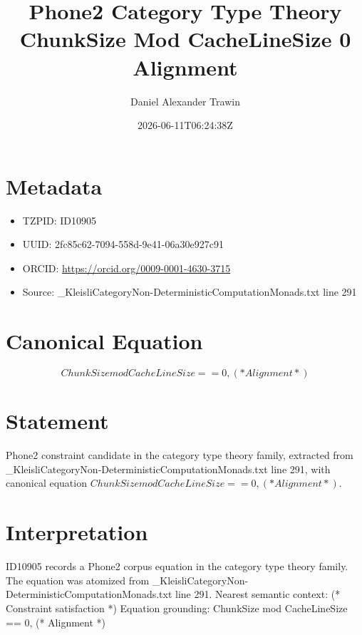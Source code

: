 \documentclass[11pt]{article}
\title{Phone2 Category Type Theory ChunkSize Mod CacheLineSize 0 Alignment}
\author{Daniel Alexander Trawin}
\date{2026-06-11T06:24:38Z}
\begin{document}
\maketitle
\section*{Metadata}
\begin{itemize}
\item TZPID: ID10905
\item UUID: 2fc85c62-7094-558d-9e41-06a30e927c91
\item ORCID: \url{https://orcid.org/0009-0001-4630-3715}
\item Source: _KleisliCategoryNon-DeterministicComputationMonads.txt line 291
\end{itemize}
\section*{Canonical Equation}
\[
ChunkSize mod CacheLineSize == 0, (* Alignment *)
\]
\section*{Statement}
Phone2 constraint candidate in the category type theory family, extracted from _KleisliCategoryNon-DeterministicComputationMonads.txt line 291, with canonical equation $ChunkSize mod CacheLineSize == 0, (* Alignment *)$.
\section*{Interpretation}
ID10905 records a Phone2 corpus equation in the category type theory family. The equation was atomized from _KleisliCategoryNon-DeterministicComputationMonads.txt line 291. Nearest semantic context: (* Constraint satisfaction *) Equation grounding: ChunkSize mod CacheLineSize == 0, (* Alignment *)
\end{document}
